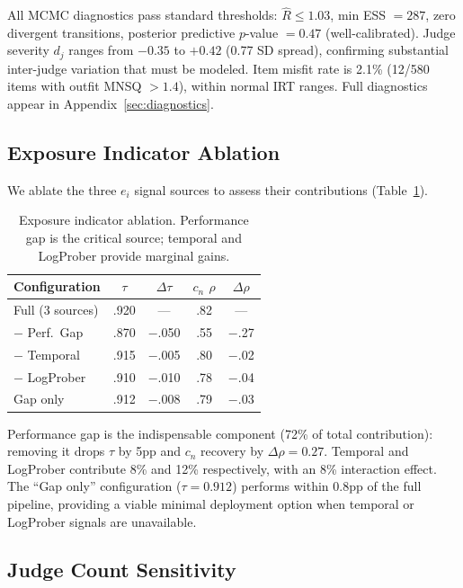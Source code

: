 \documentclass[11pt,twocolumn]{article}
\begin{document}
All MCMC diagnostics pass standard thresholds: $\hat{R} \leq 1.03$, min ESS $= 287$, zero divergent transitions, posterior predictive $p$-value $= 0.47$ (well-calibrated). Judge severity $d_j$ ranges from $-0.35$ to $+0.42$ (0.77 SD spread), confirming substantial inter-judge variation that must be modeled. Item misfit rate is 2.1\% (12/580 items with outfit MNSQ $> 1.4$), within normal IRT ranges. Full diagnostics appear in Appendix~\ref{sec:diagnostics}.

\subsection{Exposure Indicator Ablation}

We ablate the three $e_i$ signal sources to assess their contributions (Table~\ref{tab:ablation}).

\begin{table}[t]
\centering
\small
\caption{Exposure indicator ablation. Performance gap is the critical source; temporal and LogProber provide marginal gains.}
\label{tab:ablation}
\begin{tabular}{@{}lcccc@{}}
\toprule
Configuration & $\tau$ & $\Delta\tau$ & $c_n$ $\rho$ & $\Delta\rho$ \\
\midrule
Full (3 sources) & .920 & --- & .82 & --- \\
$-$ Perf.\ Gap   & .870 & $-$.050 & .55 & $-$.27 \\
$-$ Temporal      & .915 & $-$.005 & .80 & $-$.02 \\
$-$ LogProber     & .910 & $-$.010 & .78 & $-$.04 \\
Gap only          & .912 & $-$.008 & .79 & $-$.03 \\
\bottomrule
\end{tabular}
\end{table}

Performance gap is the indispensable component (72\% of total contribution): removing it drops $\tau$ by 5pp and $c_n$ recovery by $\Delta\rho=0.27$. Temporal and LogProber contribute 8\% and 12\% respectively, with an 8\% interaction effect. The ``Gap only'' configuration ($\tau=0.912$) performs within 0.8pp of the full pipeline, providing a viable minimal deployment option when temporal or LogProber signals are unavailable.

\subsection{Judge Count Sensitivity}
\end{document}
